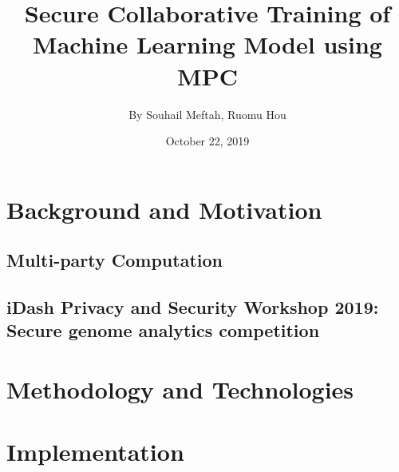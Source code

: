 \documentclass[a4paper,12pt]{article}
\begin{document}
\title{\Large{\textbf{Secure Collaborative Training of Machine Learning Model using MPC}}}
\author{By Souhail Meftah, Ruomu Hou}
\date{October 22, 2019}
\maketitle
\let\cleardoublepage\clearpage
\setcounter{page}{1}
\fancyhf{}



\section{Background and Motivation}

\subsection{Multi-party Computation}

\subsection{iDash Privacy and Security Workshop 2019: Secure genome analytics competition}

\section{Methodology and Technologies}

\section{Implementation}
\end{document}
